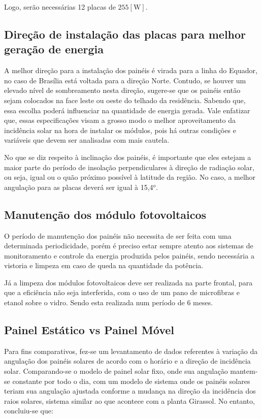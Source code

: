 	Logo, serão necessárias 12 placas de $255 [\si{\watt}]$.

\subsection{Direção de instalação das placas para melhor geração de energia}

	A melhor direção para a instalação dos painéis é virada para a linha do Equador, no caso de Brasília está voltada para a direção Norte. Contudo, se houver um elevado nível de sombreamento nesta direção, sugere-se que os painéis então sejam colocados na face leste ou oeste do telhado da residência. Sabendo que, essa escolha poderá influenciar na quantidade de energia gerada. Vale enfatizar que, essas especificações visam a grosso modo o melhor aproveitamento da incidência solar na hora de instalar os módulos, pois há outras condições e variáveis que devem ser analisadas com mais cautela.

	No que se diz respeito à inclinação dos painéis, é importante que eles estejam a maior parte do período de insolação perpendiculares à direção de radiação solar, ou seja, igual ou o quão próximo possível à latitude da região. No caso, a melhor angulação para as placas deverá ser igual à 15,4$^o$.

\subsection{Manutenção dos módulo fotovoltaicos}

	O período de manutenção dos painéis não necessita de ser feita com uma determinada periodicidade, porém é preciso estar sempre atento aos sistemas de monitoramento e controle da energia produzida pelos painéis, sendo necessária a vistoria e limpeza em caso de queda na quantidade da potência.

	Já a limpeza dos módulos fotovoltaicos deve ser realizada na parte frontal, para que a eficiência não seja interferida, com o uso de um pano de microfibras e etanol sobre o vidro. Sendo esta realizada num período de 6 meses.

\subsection{Painel Estático vs Painel Móvel}

	Para fins comparativos, fez-se um levantamento de dados referentes à variação da angulação dos painéis solares de acordo com o horário e a direção de incidência solar. Comparando-se o modelo de painel solar fixo, onde sua angulação mantem-se constante por todo o dia, com um modelo de sistema onde os painéis solares teriam sua angulação ajustada conforme a mudança na direção da incidência dos raios solares, sistema similar ao que acontece com a planta Girassol. No entanto, concluiu-se que:

